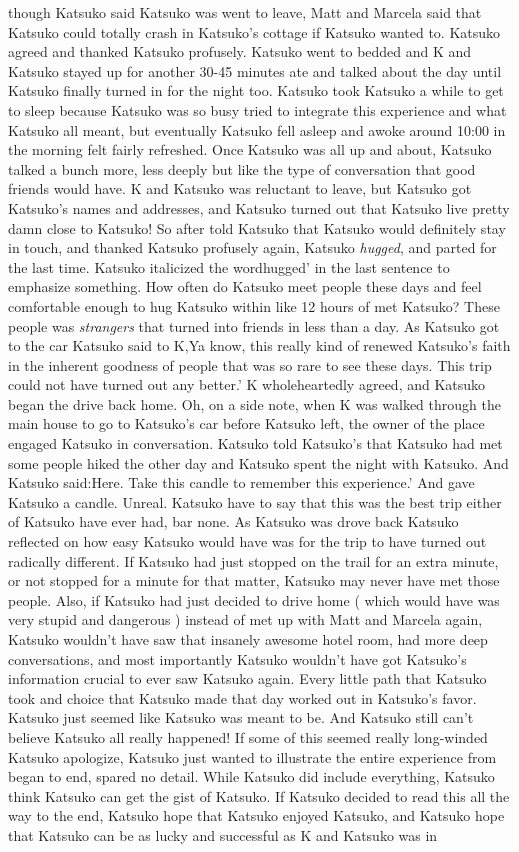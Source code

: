 \documentclass[12pt]{book}
\begin{document}
though Katsuko said Katsuko was went to leave, Matt and Marcela said that Katsuko could totally crash in Katsuko's cottage if Katsuko wanted to. Katsuko agreed and thanked Katsuko profusely. Katsuko went to bedded and K and Katsuko stayed up for another 30-45 minutes ate and talked about the day until Katsuko finally turned in for the night too. Katsuko took Katsuko a while to get to sleep because Katsuko was so busy tried to integrate this experience and what Katsuko all meant, but eventually Katsuko fell asleep and awoke around 10:00 in the morning felt fairly refreshed. Once Katsuko was all up and about, Katsuko talked a bunch more, less deeply but like the type of conversation that good friends would have. K and Katsuko was reluctant to leave, but Katsuko got Katsuko's names and addresses, and Katsuko turned out that Katsuko live pretty damn close to Katsuko! So after told Katsuko that Katsuko would definitely stay in touch, and thanked Katsuko profusely again, Katsuko \emph{hugged}, and parted for the last time. Katsuko italicized the wordhugged' in the last sentence to emphasize something. How often do Katsuko meet people these days and feel comfortable enough to hug Katsuko within like 12 hours of met Katsuko? These people was \emph{strangers} that turned into friends in less than a day. As Katsuko got to the car Katsuko said to K,Ya know, this really kind of renewed Katsuko's faith in the inherent goodness of people that was so rare to see these days. This trip could not have turned out any better.' K wholeheartedly agreed, and Katsuko began the drive back home. Oh, on a side note, when K was walked through the main house to go to Katsuko's car before Katsuko left, the owner of the place engaged Katsuko in conversation. Katsuko told Katsuko's that Katsuko had met some people hiked the other day and Katsuko spent the night with Katsuko. And Katsuko said:Here. Take this candle to remember this experience.' And gave Katsuko a candle. Unreal. Katsuko have to say that this was the best trip either of Katsuko have ever had, bar none. As Katsuko was drove back Katsuko reflected on how easy Katsuko would have was for the trip to have turned out radically different. If Katsuko had just stopped on the trail for an extra minute, or not stopped for a minute for that matter, Katsuko may never have met those people. Also, if Katsuko had just decided to drive home ( which would have was very stupid and dangerous ) instead of met up with Matt and Marcela again, Katsuko wouldn't have saw that insanely awesome hotel room, had more deep conversations, and most importantly Katsuko wouldn't have got Katsuko's information crucial to ever saw Katsuko again. Every little path that Katsuko took and choice that Katsuko made that day worked out in Katsuko's favor. Katsuko just seemed like Katsuko was meant to be. And Katsuko still can't believe Katsuko all really happened! If some of this seemed really long-winded Katsuko apologize, Katsuko just wanted to illustrate the entire experience from began to end, spared no detail. While Katsuko did include everything, Katsuko think Katsuko can get the gist of Katsuko. If Katsuko decided to read this all the way to the end, Katsuko hope that Katsuko enjoyed Katsuko, and Katsuko hope that Katsuko can be as lucky and successful as K and Katsuko was in 
\end{document}
